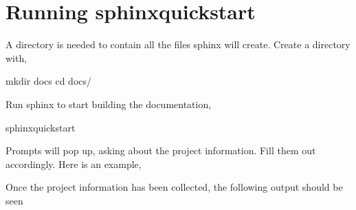 \documentclass[letterpaper,10pt,english]{sphinxhowto}
\begin{document}
\section{Running sphinx\sphinxhyphen{}quickstart}
\label{\detokenize{index:running-sphinx-quickstart}}
\sphinxAtStartPar
A  directory is needed to contain all the files sphinx will create. Create a  directory with,

\begin{sphinxVerbatim}[commandchars=\\\{\}]
\PYGZdl{} mkdir docs
\PYGZdl{} cd docs/
\end{sphinxVerbatim}

\sphinxAtStartPar
Run sphinx to start building the documentation,

\begin{sphinxVerbatim}[commandchars=\\\{\}]
\PYGZdl{} sphinx\PYGZhy{}quickstart
\end{sphinxVerbatim}

\sphinxAtStartPar
Prompts will pop up, asking about the project information. Fill them out accordingly. Here is an example,

\begin{sphinxVerbatim}[commandchars=\\\{\}]
   
    
   \PYG{p}{[}\PYG{p}{]} 
   \PYG{p}{[}\PYG{p}{]}       
\end{sphinxVerbatim}

\sphinxAtStartPar
Once the project information has been collected, the following output should be seen
\end{document}
